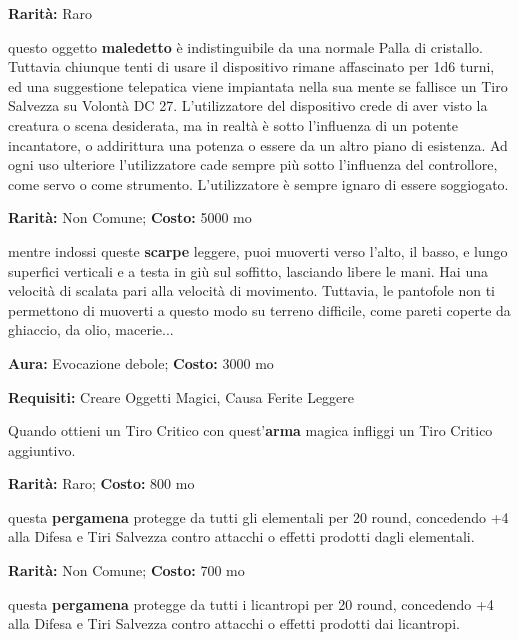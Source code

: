 \begin{multicols}{2}

\textbf{Rarità:} Raro

questo oggetto \textbf{maledetto} è indistinguibile da una normale Palla di cristallo. Tuttavia chiunque tenti di usare il dispositivo rimane affascinato per 1d6 turni, ed una suggestione telepatica viene impiantata nella sua mente se fallisce un Tiro Salvezza su Volontà DC 27. L'utilizzatore del dispositivo crede di aver visto la creatura o scena desiderata, ma in realtà è sotto l'influenza di un potente incantatore, o addirittura una potenza o essere da un altro piano di esistenza. Ad ogni uso ulteriore l'utilizzatore cade sempre più sotto l'influenza del controllore, come servo o come strumento. L'utilizzatore è sempre ignaro di essere soggiogato.


\textbf{Rarità:} Non Comune; \textbf{Costo:} 5000 mo

mentre indossi queste \textbf{scarpe} leggere, puoi muoverti verso l'alto, il basso, e lungo superfici verticali e a testa in giù sul soffitto, lasciando libere le mani. Hai una velocità di scalata pari alla velocità di movimento. Tuttavia, le pantofole non ti permettono di muoverti a questo modo su terreno difficile, come pareti coperte da ghiaccio, da olio, macerie...


\textbf{Aura:} Evocazione debole; \textbf{Costo:} 3000 mo

\textbf{Requisiti:} Creare Oggetti Magici, Causa Ferite Leggere

Quando ottieni un Tiro Critico con quest'\textbf{arma} magica infliggi un Tiro Critico aggiuntivo.


\textbf{Rarità:} Raro; \textbf{Costo:} 800 mo

questa \textbf{pergamena} protegge da tutti gli elementali per 20 round, concedendo +4 alla Difesa e Tiri Salvezza contro attacchi o effetti prodotti dagli elementali.


\textbf{Rarità:} Non Comune; \textbf{Costo:} 700 mo

questa \textbf{pergamena} protegge da tutti i licantropi per 20 round, concedendo +4 alla Difesa e Tiri Salvezza contro attacchi o effetti prodotti dai licantropi.


\end{multicols}
